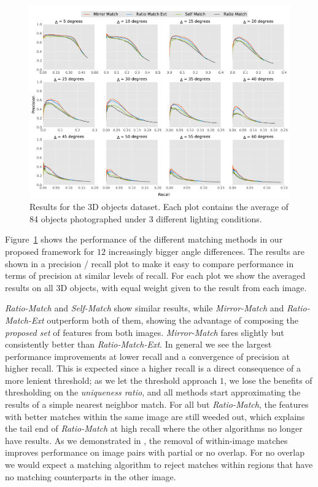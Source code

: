 \documentclass[review]{elsarticle}
\begin{document}
\begin{figure}[t]
	\centering
    \includegraphics[width=\columnwidth]{images/results_all_objects}
    \caption{Results for the 3D objects dataset. Each plot 
    contains the average of 84 objects photographed under 3 
different lighting conditions.}
    \label{fig:all_objects}
\end{figure}

Figure~\ref{fig:all_objects} shows the performance of the different matching methods in our proposed framework for $12$ increasingly bigger angle differences. The results are shown in a precision / recall plot to make it easy to compare performance in terms of precision at similar levels of recall.  For each plot we show the averaged results on all 3D objects, with equal weight given to the result from each image.

\emph{Ratio-Match} and \emph{Self-Match} show similar results, while \emph{Mirror-Match} and \emph{Ratio-Match-Ext} outperform both of them, showing the advantage of composing the \emph{proposed set} of features from both images. \emph{Mirror-Match} fares slightly but consistently better than \emph{Ratio-Match-Ext}. In general we see the largest performance improvements at lower recall and a  convergence of precision at higher recall. This is expected since a higher recall is a direct consequence of a more lenient threshold; as we let the threshold approach $1$, we lose the benefits of thresholding on the \emph{uniqueness ratio}, and all methods start approximating the results of a simple nearest neighbor match. For all but \emph{Ratio-Match}, the features with better matches within the same image are still weeded out, which explains the tail end of \emph{Ratio-Match} at high recall where the other algorithms no longer have results. As we demonstrated in \cite{arnfred2013mirror}, the removal of within-image matches improves performance on image pairs with partial or no overlap. For no overlap we would expect a matching algorithm to reject matches within regions that have no matching counterparts in the other image.
\end{document}
